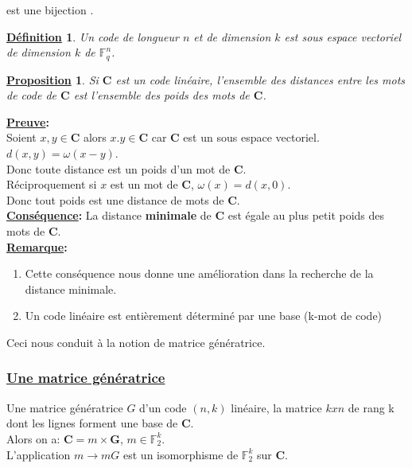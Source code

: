 \documentclass[12pt,openany]{report}
\newtheorem{proposition}{\underline{Proposition}}
\newtheorem{definition}{\underline{Définition}}
\begin{document}
est une bijection .
\begin{definition} Un code de longueur $n$ et de dimension $k$ est sous espace vectoriel de dimension $k$ de $\mathbb{F}_q^n$.
\end{definition}
\begin{proposition} Si $\mathbf{C}$ est un code linéaire, l'ensemble des distances entre les mots de code de $\mathbf{C}$ est l'ensemble des poids des mots de $\mathbf{C}$.
\end{proposition}
\textbf{\underline{Preuve}: }\\ Soient $x,y \in \mathbf{C}$ alors $x.y \in \mathbf{C}$ car $\mathbf{C}$ est un sous espace vectoriel.\\
$ d\left( x,y\right) = \omega \left( x-y\right)$.\\
Donc toute distance est un poids d'un mot de $\mathbf{C}$.\\
Réciproquement si $x$ est un mot de $\mathbf{C}$,
$ \omega\left( x\right)=d\left(x , 0\right).$\\
Donc tout poids est une distance de mots de $\mathbf{C}$.\\
\textbf{\underline{Conséquence}:} La distance \textbf{minimale} de $\mathbf{C}$ est égale au plus petit poids des mots de $\mathbf{C}$.\\
\textbf{\underline{Remarque}:}
\begin{enumerate}
\item Cette conséquence nous donne une amélioration dans la recherche de la distance minimale.
\item Un code linéaire est entièrement déterminé par une base (k-mot de code)
\end{enumerate}

Ceci nous conduit à la notion de matrice génératrice.
\subsubsection{\underline{Une matrice génératrice}}

Une matrice génératrice $\mathit{G}$ d'un code $(n,k)$ linéaire, la matrice $ k x n$ de rang k dont les lignes forment une base de $\mathbf{C}$.\\
Alors on a: $\mathbf{C}= m \times \mathbf{G}$, $ m \in \mathbb{F}_2^{k} $.\\
L'application $m \rightarrow m\mathit{G}$ est un isomorphisme de $\mathbb{F}_2^k$ sur 
$\mathbf{C}$.\\
\end{document}

